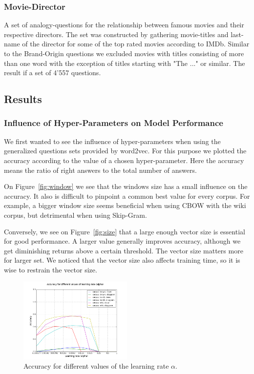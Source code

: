 \documentclass[conference]{IEEEtran}
\begin{document}
\subsubsection{Movie-Director}
A set of analogy-questions for the relationship between famous movies and their respective 
directors. The set was constructed by gathering movie-titles and last-name of the director for 
some of the top rated movies according to IMDb. Similar to the Brand-Origin questions we 
excluded movies with titles consisting of more than one word with the exception of titles 
starting with "The ..." or similar.  The result if a set of 4'557 questions. 


\subsection{Results}

\subsubsection{Influence of Hyper-Parameters on Model Performance}
We first wanted to see the influence of hyper-parameters when using the generalized questions sets provided by word2vec. For this purpose we plotted the accuracy according to the value of a chosen hyper-parameter. Here the accuracy means the ratio of right answers to the total number of answers.

On Figure~\ref{fig:window} we see that the windows size has a small influence on the accuracy. It also is difficult to pinpoint a common best value for every corpus. For example, a bigger window size seems beneficial when using CBOW with the wiki corpus, but detrimental when using Skip-Gram.

Conversely, we see on Figure~\ref{fig:size} that a large enough vector size is essential for good performance. A larger value generally improves accuracy, although we get diminishing returns above a certain threshold. The vector size matters more for larger set.
We noticed that the vector size also affects training time, so it is wise to restrain the vector size.

\begin{figure}[t]
\centering
\includegraphics[width=0.5\textwidth]{graph_acc_alpha}
\caption{Accuracy for different values of the learning rate $\alpha$. }
\label{fig:alpha}
\end{figure}
\end{document}
